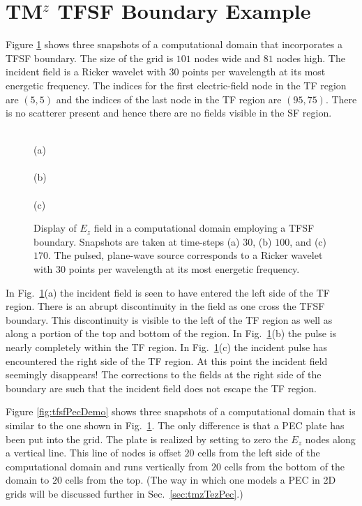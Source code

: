 \section{TM$^z$ TFSF Boundary Example \label{sec:tmzTfsf}}

Figure \ref{fig:tfsfDemo} shows three snapshots of a computational
domain that incorporates a TFSF boundary.  The size of the grid is
$101$ nodes wide and $81$ nodes high.  The incident field is a Ricker
wavelet with $30$ points per wavelength at its most energetic
frequency.  The indices for the first electric-field node in the TF
region are $(5,5)$ and the indices of the last node in the TF region
are $(95,75)$.  There is no scatterer present and hence there are no
fields visible in the SF region.

\begin{figure}
  \begin{center}
  \\
  (a)
  \\
  \\
  (b)
  \\
  \\
  (c)
  \end{center} \caption{Display of $E_z$ field in a computational
  domain employing a TFSF boundary.  Snapshots are taken at time-steps
  (a) $30$, (b) $100$, and (c) $170$.  The pulsed, plane-wave source
  corresponds to a Ricker wavelet with $30$ points per wavelength at
  its most energetic frequency.}
  \label{fig:tfsfDemo}
\end{figure}

In Fig.\ \ref{fig:tfsfDemo}(a) the incident field is seen to have
entered the left side of the TF region.  There is an abrupt
discontinuity in the field as one cross the TFSF boundary.  This
discontinuity is visible to the left of the TF region as well as along
a portion of the top and bottom of the region.  In Fig.\
\ref{fig:tfsfDemo}(b) the pulse is nearly completely within the TF
region.  In Fig.\ \ref{fig:tfsfDemo}(c) the incident pulse has
encountered the right side of the TF region.  At this point the
incident field seemingly disappears!  The corrections to the fields at
the right side of the boundary are such that the incident field does
not escape the TF region.

Figure \ref{fig:tfsfPecDemo} shows three snapshots of a computational
domain that is similar to the one shown in Fig.\ \ref{fig:tfsfDemo}.
The only difference is that a PEC plate has been put into the grid.
The plate is realized by setting to zero the $E_z$ nodes along a
vertical line.  This line of nodes is offset $20$ cells from the left
side of the computational domain and runs vertically from $20$ cells
from the bottom of the domain to $20$ cells from the top.  (The way in
which one models a PEC in 2D grids will be discussed further in Sec.\
\ref{sec:tmzTezPec}.)

